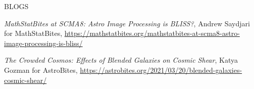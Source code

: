 \documentclass{resume} %
\begin{document}

\begin{rSection}{BLOGS}
%
\vspace*{-1em}

\item \textit{MathStatBites at SCMA8: Astro Image Processing is BLISS?}, Andrew Saydjari for MathStatBites, \url{https://mathstatbites.org/mathstatbites-at-scma8-astro-image-processing-is-bliss/}

\item \textit{The Crowded Cosmos: Effects of Blended Galaxies on Cosmic Shear}, Katya Gozman for AstroBites, \url{https://astrobites.org/2021/03/20/blended-galaxies-cosmic-shear/}

\end{rSection}
\end{document}
